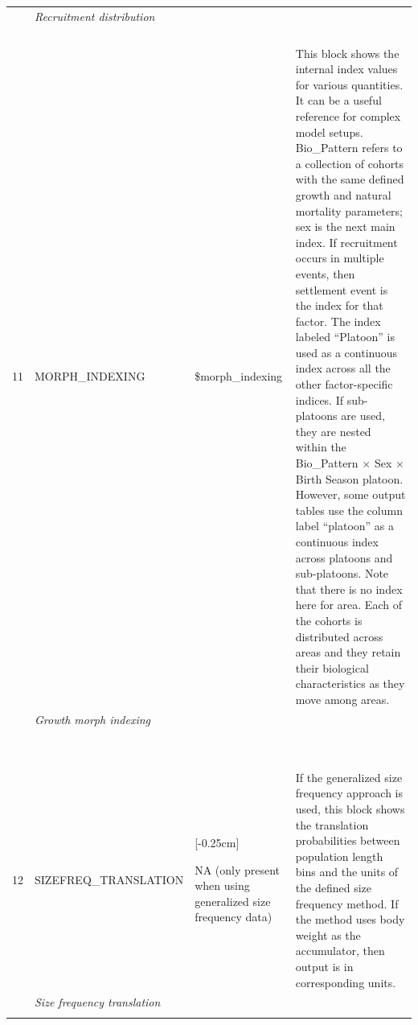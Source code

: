 \begin{landscape}
\begin{longtable}{p{1.5cm} p{5.5cm} >{\RaggedRight\arraybackslash}p{4.25cm} p{9.75cm}}
       & \textit{Recruitment distribution} & & \\
       & & & \\
       & & & \\
       & & & \\
       & & & \Bstrut\\
    11 & MORPH\_INDEXING & \$morph\_indexing & \multirow{1}{1cm}[-0.25cm]{\parbox{9.5cm}{This block shows the internal index values for various quantities. It can be a useful reference for complex model setups. Bio\_Pattern refers to a collection of cohorts with the same defined growth and natural mortality parameters; sex is the next main index. If recruitment occurs in multiple events, then settlement event is the index for that factor. The index labeled ``Platoon'' is used as a continuous index across all the other factor-specific indices. If sub-platoons are used, they are nested within the Bio\_Pattern $\times$ Sex $\times$ Birth Season platoon. However, some output tables use the column label ``platoon'' as a continuous index across platoons and sub-platoons. Note that there is no index here for area. Each of the cohorts is distributed across areas and they retain their biological characteristics as they move among areas.}} \\
       & \textit{Growth morph indexing} & & \Bstrut\\
       & & & \Bstrut\\
       & & & \Bstrut\\
       & & & \Bstrut\\
       & & & \Bstrut\\
       & & & \Bstrut\\
       & & & \Bstrut\\
       & & & \Bstrut\\
       & & & \Bstrut\\
       & & & \Bstrut\\
    12 & SIZEFREQ\_TRANSLATION & \multirow{1}{1cm}[-0.25cm]{\parbox{4cm}{NA (only present when using generalized size frequency data)}} & \multirow{1}{1cm}[-0.25cm]{\parbox{9.5cm}{If the generalized size frequency approach is used, this block shows the translation probabilities between population length bins and the units of the defined size frequency method. If the method uses body weight as the accumulator, then output is in corresponding units.}} \\
       & \textit{Size frequency translation} & & \\
       & & & \\

\end{longtable}
\end{landscape}
